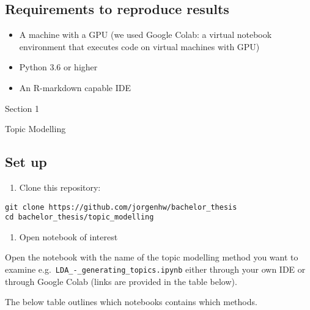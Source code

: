 \documentclass[
]{article}
\providecommand{\tightlist}{%
  \setlength{\itemsep}{0pt}\setlength{\parskip}{0pt}}
\begin{document}
\hypertarget{requirements-to-reproduce-results}{%
\subsection{Requirements to reproduce
results}\label{requirements-to-reproduce-results}}

\begin{itemize}
\tightlist
\item
  A machine with a GPU (we used Google Colab: a virtual notebook
  environment that executes code on virtual machines with GPU)
\item
  Python 3.6 or higher
\item
  An R-markdown capable IDE
\end{itemize}

Section 1

Topic Modelling

\hypertarget{set-up}{%
\subsection{Set up}\label{set-up}}

\begin{enumerate}
\def\labelenumi{\arabic{enumi}.}
\tightlist
\item
  Clone this repository:
\end{enumerate}

\begin{verbatim}
git clone https://github.com/jorgenhw/bachelor_thesis
cd bachelor_thesis/topic_modelling
\end{verbatim}

\begin{enumerate}
\def\labelenumi{\arabic{enumi}.}
\setcounter{enumi}{1}
\tightlist
\item
  Open notebook of interest
\end{enumerate}

Open the notebook with the name of the topic modelling method you want
to examine e.g.~\texttt{LDA\_-\_generating\_topics.ipynb} either through
your own IDE or through Google Colab (links are provided in the table
below).

The below table outlines which notebooks contains which methods.
\end{document}
